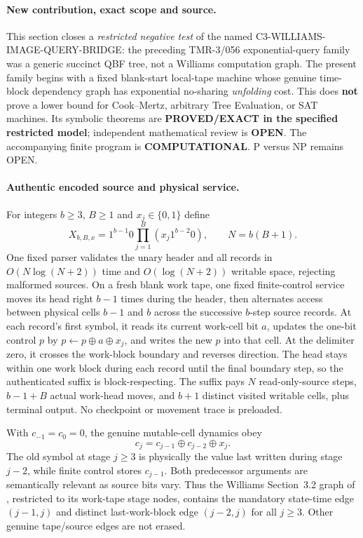\documentclass[11pt]{article}
\begin{document}
\paragraph{New contribution, exact scope and source.}
This section closes a \emph{restricted negative test} of the named
\textsf{C3-WILLIAMS-IMAGE-QUERY-BRIDGE}: the preceding TMR-3/056
exponential-query family was a generic succinct QBF tree, not a
Williams computation graph. The present family begins with a fixed
blank-start local-tape machine whose genuine time-block dependency
graph has exponential no-sharing \emph{unfolding} cost. This does
\textbf{not} prove a lower bound for Cook--Mertz, arbitrary
Tree Evaluation, or SAT machines. Its symbolic theorems are
\textbf{PROVED/EXACT in the specified restricted model};
independent mathematical review is \textbf{OPEN}. The accompanying
finite program is \textbf{COMPUTATIONAL}. P versus NP remains OPEN.

\paragraph{Authentic encoded source and physical service.}
For integers $b\ge3$, $B\ge1$ and $x_j\in\{0,1\}$ define
\[
X_{b,B,x}=1^{b-1}0
\prod_{j=1}^{B}\left(x_j1^{b-2}0\right),
\qquad N=b(B+1).
\]
One fixed parser validates the unary header and all records in
$O(N\log(N+2))$ time and $O(\log(N+2))$ writable space,
rejecting malformed sources. On a fresh blank work tape, one fixed
finite-control service moves its head right $b-1$ times during the
header, then alternates access between physical cells $b-1$ and
$b$ across the successive $b$-step source records. At each record's
first symbol, it reads its current work-cell bit $a$, updates the
one-bit control $p$ by $p\leftarrow p\oplus a\oplus x_j$,
and writes the new $p$ into that cell. At the delimiter zero,
it crosses the work-block boundary and reverses direction.
The head stays within one work block during each record until the
final boundary step, so the authenticated suffix is
block-respecting. The suffix pays $N$ read-only-source steps,
$b-1+B$ actual work-head moves, and $b+1$ distinct visited
writable cells, plus terminal output. No checkpoint or movement
trace is preloaded.

With $c_{-1}=c_0=0$, the genuine mutable-cell dynamics obey
\[
\boxed{c_j=c_{j-1}\oplus c_{j-2}\oplus x_j.}
\]
The old symbol at stage $j\ge3$ is physically the value last
written during stage $j-2$, while finite control stores
$c_{j-1}$. Both predecessor arguments are semantically relevant
as source bits vary. Thus the Williams Section~3.2 graph of
\cite{Williams2025}, restricted to its work-tape stage nodes,
contains the mandatory state-time edge $(j-1,j)$
and distinct last-work-block edge $(j-2,j)$ for all $j\ge3$.
Other genuine tape/source edges are not erased.
\end{document}

